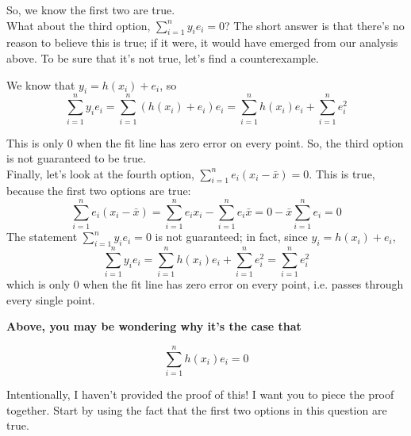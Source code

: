 \documentclass[11pt]{article}
\begin{document}
\begin{prob}[(14 pts)]
\begin{subprob}
\begin{solution}
So, we know the first two are true. \\

What about the third option, $\displaystyle\sum_{i=1}^n y_i e_i=0$? The short answer is that there's no reason to believe this is true; if it were, it would have emerged from our analysis above. To be sure that it's not true, let's find a counterexample.

We know that $y_i = h(x_i) + e_i$, so
\[
\sum_{i=1}^n y_i e_i = \sum_{i=1}^n (h(x_i) + e_i) e_i = \sum_{i=1}^n h(x_i) e_i + \sum_{i=1}^n e_i^2
\]

This is only $0$ when the fit line has zero error on every point. So, the third option is not guaranteed to be true. \\

Finally, let's look at the fourth option, $\sum_{i=1}^n e_i(x_i-\bar x)=0$. This is true, because the first two options are true:
\[
\sum_{i=1}^n e_i(x_i-\bar x)=\sum_{i=1}^n e_i x_i -\sum_{i=1}^n e_i \bar x = 0 - \bar x \sum_{i=1}^n e_i = 0
\]
The statement $\sum_{i=1}^n y_i e_i=0$ is not guaranteed; in fact, since $y_i=h(x_i)+e_i$,
\[
\sum_{i=1}^n y_i e_i=\sum_{i=1}^n h(x_i)e_i+\sum_{i=1}^n e_i^2=\sum_{i=1}^n e_i^2
\]
which is only $0$ when the fit line has zero error on every point, i.e. passes through every single point.

\textbf{Above, you may be wondering why it's the case that}

$$\sum_{i = 1}^n h(x_i) e_i = 0$$

Intentionally, I haven't provided the proof of this! I want you to piece the proof together. Start by using the fact that the first two options in this question are true.

\end{solution}
\end{subprob}
\end{prob}

\vspace{0.25in}
\end{document}
